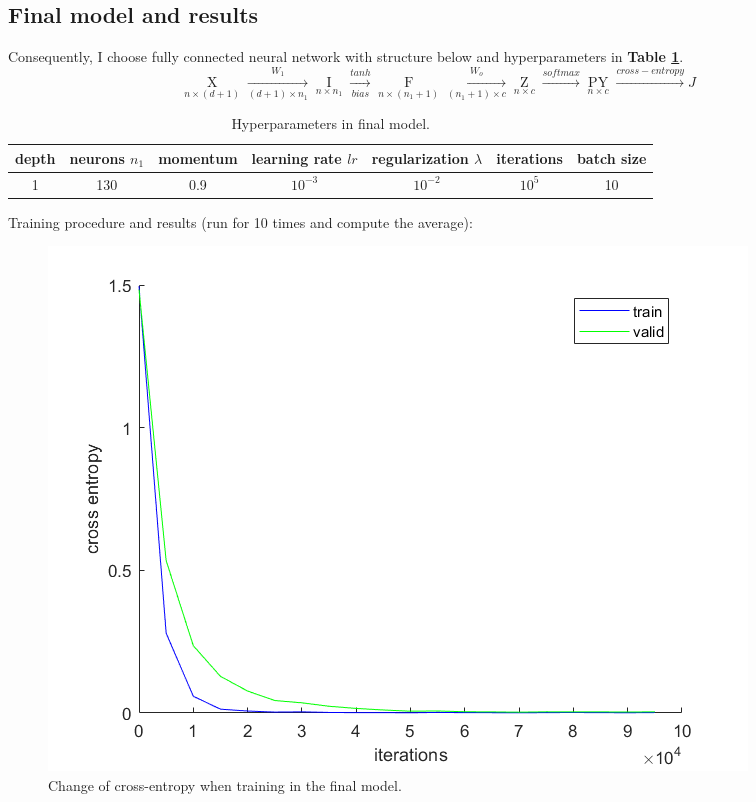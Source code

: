 \documentclass{article}
\begin{document}
\subsection{Final model and results}
Consequently, I choose fully connected neural network with structure below and hyperparameters in \textbf{Table \ref{tab4}}.
\[
\mathop{X}\limits_{n\times(d+1)}\xrightarrow[(d+1)\times n_1]{W_1}
\mathop{IP_1}\limits_{n\times n_1}\xrightarrow[bias]{tanh}
\mathop{FP_1}\limits_{n\times(n_1+1)}\xrightarrow[(n_1+1)\times c]{W_o}
\mathop{Z}\limits_{n\times c}\xrightarrow{softmax}
\mathop{PY}\limits_{n\times c}\xrightarrow{cross-entropy}
J
\]

\begin{table}[H]
	\centering
	\caption{Hyperparameters in final model.}
	\label{tab4}
	\begin{tabular}{ccccccc}
	\toprule
	depth & neurons $n_1$ & momentum & learning rate $lr$& regularization $\lambda$& iterations & batch size\\
	\midrule
	1 & 130 & 0.9 & $10^{-3}$ & $10^{-2}$ & $10^{5}$ & 10\\
	\bottomrule
	\end{tabular}
\end{table}

Training procedure and results (run for 10 times and compute the average):

\begin{figure}[H]
	\centering
	\includegraphics[scale=0.5]{figure9}
	\caption{Change of cross-entropy when training in the final model.}
	\label{fig9}
\end{figure}
\end{document}
